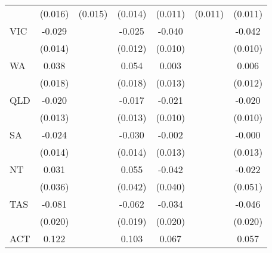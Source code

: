 {\begin{tabular}{l*{6}{c}}
                    &     (0.016)         &     (0.015)         &     (0.014)         &     (0.011)         &     (0.011)         &     (0.011)         \\
VIC                 &      -0.029\sym{**} &                     &      -0.025\sym{**} &      -0.040\sym{***}&                     &      -0.042\sym{***}\\
                    &     (0.014)         &                     &     (0.012)         &     (0.010)         &                     &     (0.010)         \\
WA                  &       0.038\sym{**} &                     &       0.054\sym{***}&       0.003         &                     &       0.006         \\
                    &     (0.018)         &                     &     (0.018)         &     (0.013)         &                     &     (0.012)         \\
QLD                 &      -0.020         &                     &      -0.017         &      -0.021\sym{**} &                     &      -0.020\sym{**} \\
                    &     (0.013)         &                     &     (0.013)         &     (0.010)         &                     &     (0.010)         \\
SA                  &      -0.024\sym{*}  &                     &      -0.030\sym{**} &      -0.002         &                     &      -0.000         \\
                    &     (0.014)         &                     &     (0.014)         &     (0.013)         &                     &     (0.013)         \\
NT                  &       0.031         &                     &       0.055         &      -0.042         &                     &      -0.022         \\
                    &     (0.036)         &                     &     (0.042)         &     (0.040)         &                     &     (0.051)         \\
TAS                 &      -0.081\sym{***}&                     &      -0.062\sym{***}&      -0.034\sym{*}  &                     &      -0.046\sym{**} \\
                    &     (0.020)         &                     &     (0.019)         &     (0.020)         &                     &     (0.020)         \\
ACT                 &       0.122\sym{***}&                     &       0.103\sym{***}&       0.067\sym{**} &                     &       0.057\sym{**} \\

\end{tabular}}

